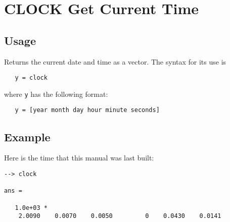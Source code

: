 \section{CLOCK Get Current Time}

\subsection{Usage}

Returns the current date and time as a vector.  The syntax for its use is
\begin{verbatim}
   y = clock
\end{verbatim}
where \verb|y| has the following format:
\begin{verbatim}
   y = [year month day hour minute seconds]
\end{verbatim}
\subsection{Example}

Here is the time that this manual was last built:
\begin{verbatim}
--> clock

ans = 

   1.0e+03 * 
    2.0090    0.0070    0.0050         0    0.0430    0.0141 
\end{verbatim}
